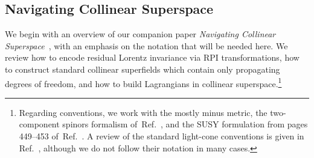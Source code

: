 \documentclass[12pt,document,nofootinbib,superscriptaddress,onecolumn,preprintnumbers,balancelastpage]{article}
\DeclareRobustCommand{\Ref}[1]{Ref.~\cite{#1}}
\begin{document}
\begin{spacing}{1.2}
\section{Navigating Collinear Superspace}
\label{sec:formalism}


We begin with an overview of our companion paper \emph{Navigating Collinear Superspace}~\cite{Cohen:2018qvn}, with an emphasis on the notation that will be needed here.
%
We review how to encode residual Lorentz invariance via RPI transformations, how to construct standard collinear superfields which contain only propagating degrees of freedom, and how to build Lagrangians in collinear superspace.\footnote{Regarding conventions, we work with the mostly minus metric, the two-component spinors formalism of~\Ref{Dreiner:2008tw}, and the SUSY formulation from pages 449--453 of~\Ref{Binetruy:2006ad}.  A review of the standard light-cone conventions is given in \Ref{Leibbrandt:1983pj}, although we do not follow their notation in many cases.}  




\end{spacing}
\end{document}
